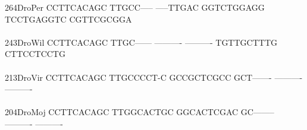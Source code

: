 \documentclass[11pt,twoside,reqno,a4paper]{article}
\begin{document}
{264\hspace*{1\charwidth}DroPer	CCTTCACAGC	TTGCC-----	-----TTGAC	GGTCTGGAGG	TCCTGAGGTC	CGTTCGCGGA	\\
\hspace*{4\charwidth}\hspace*{7\charwidth}\hspace*{1\charwidth}\hspace*{1\charwidth}\hspace*{1\charwidth}\hspace*{1\charwidth}\hspace*{1\charwidth}\hspace*{1\charwidth}\\
243\hspace*{1\charwidth}DroWil	CCTTCACAGC	TTGC------	----------	----------	TGTTGCTTTG	CTTCCTCCTG	\\
\hspace*{4\charwidth}\hspace*{7\charwidth}\hspace*{1\charwidth}\hspace*{1\charwidth}\hspace*{1\charwidth}\hspace*{1\charwidth}\hspace*{1\charwidth}\hspace*{1\charwidth}\\
213\hspace*{1\charwidth}DroVir	CCTTCACAGC	TTGCCCCT-C	GCCGCTCGCC	GCT-------	----------	----------	\\
\hspace*{4\charwidth}\hspace*{7\charwidth}\hspace*{1\charwidth}\hspace*{1\charwidth}\hspace*{1\charwidth}\hspace*{1\charwidth}\hspace*{1\charwidth}\hspace*{1\charwidth}\\
204\hspace*{1\charwidth}DroMoj	CCTTCACAGC	TTGGCACTGC	GGCACTCGAC	GC--------	----------	----------	\\
\hspace*{4\charwidth}\hspace*{7\charwidth}\hspace*{1\charwidth}\hspace*{1\charwidth}\hspace*{1\charwidth}\hspace*{1\charwidth}\hspace*{1\charwidth}\hspace*{1\charwidth}\\
}
\end{document}
